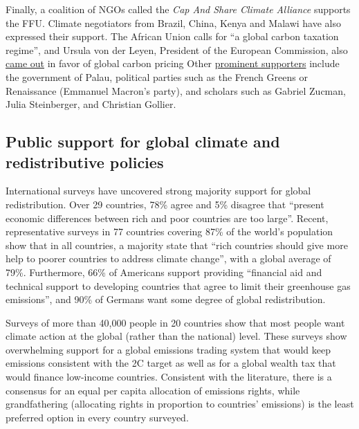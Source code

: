 \documentclass[12pt,english]{article}
\begin{document}
Finally, a coalition of NGOs called the \textit{Cap And Share Climate Alliance} supports the FFU. Climate negotiators from Brazil, China, Kenya and Malawi have also expressed their support. The African Union calls for ``a global carbon taxation regime'',\citep{african_union_african_2023} and Ursula von der Leyen, President of the European Commission, also \href{https://twitter.com/vonderleyen/status/1700416700238225659}{came out} in favor of global carbon pricing Other \href{https://global-redistribution-advocates.org/the-global-climate-plan/}{prominent supporters} include the government of Palau, political parties such as the French Greens or Renaissance (Emmanuel Macron's party), and scholars such as Gabriel Zucman, Julia Steinberger, and Christian Gollier. 


\subsection{Public support for global climate and redistributive policies\label{subsec:public_support}}

International surveys have uncovered strong majority support for global redistribution. Over 29 countries, 78\% agree and 5\% disagree that ``present economic differences between rich and poor countries are too large''.\citep{issp_international_2019} 
Recent, representative surveys in 77 countries covering 87\% of the world's population show that in all countries, a majority state that ``rich countries should give more help to poorer countries to address climate change'', with a global average of 79\%.\cite{undp_peoples_2024} Furthermore, 66\% of Americans support providing ``financial aid and technical support to developing countries that agree to limit their greenhouse gas emissions'',\cite{leiserowitz_public_2021} and 90\% of Germans want some degree of global redistribution.\cite{fehr_your_2022}

Surveys of more than 40,000 people in 20 countries show that most people want climate action at the global (rather than the national) level.\citep{fabre_majority_2025,dechezlepretre_fighting_2025} These surveys show overwhelming support for a global emissions trading system that would keep emissions consistent with the 2\textdegree{}C target as well as for a global wealth tax that would finance low-income countries. Consistent with the literature,\citep{carlsson_is_2011,meilland_international_2024,dabla-norris_public_2023} there is a consensus for an equal per capita allocation of emissions rights, while grandfathering (allocating rights in proportion to countries' emissions) is the least preferred option in every country surveyed.
\end{document}
